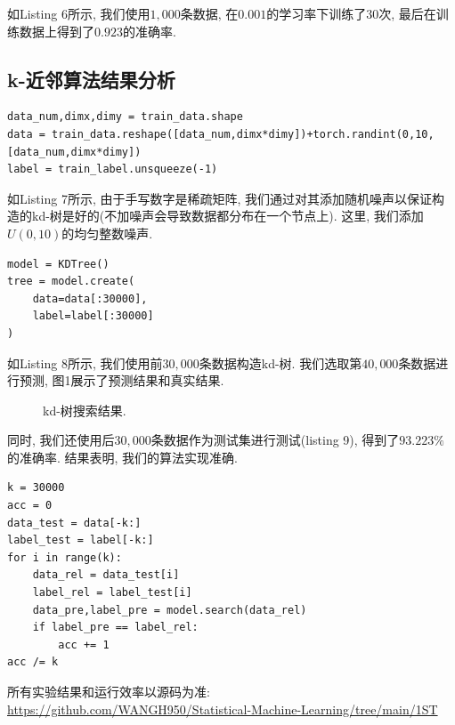 如Listing 6所示, 我们使用$1,000$条数据, 在$0.001$的学习率下训练了$30$次, 最后在训练数据上得到了$0.923$的准确率.
\subsection{k-近邻算法结果分析}
\begin{lstlisting}[caption = MNIST数据预处理]
data_num,dimx,dimy = train_data.shape
data = train_data.reshape([data_num,dimx*dimy])+torch.randint(0,10,[data_num,dimx*dimy])
label = train_label.unsqueeze(-1)
\end{lstlisting}

如Listing 7所示, 由于手写数字是稀疏矩阵, 我们通过对其添加随机噪声以保证构造的kd-树是好的(不加噪声会导致数据都分布在一个节点上). 
这里, 我们添加$U(0,10)$的均匀整数噪声.
\begin{lstlisting}[caption = 构造kd-树]
model = KDTree()
tree = model.create(
    data=data[:30000],
    label=label[:30000]
)
\end{lstlisting}

如Listing 8所示, 我们使用前$30,000$条数据构造kd-树. 我们选取第$40,000$条数据进行预测, 图1展示了预测结果和真实结果.
\begin{figure}[htpb]
    \centering
    \caption{kd-树搜索结果.}
    \label{figure1}
\end{figure}

同时, 我们还使用后$30,000$条数据作为测试集进行测试(listing 9), 得到了$93.223\%$的准确率. 结果表明, 我们的算法实现准确.
\begin{lstlisting}[caption = 使用kd-树分类测试数据]
k = 30000
acc = 0
data_test = data[-k:]
label_test = label[-k:]
for i in range(k):
    data_rel = data_test[i]
    label_rel = label_test[i]
    data_pre,label_pre = model.search(data_rel)
    if label_pre == label_rel:
        acc += 1
acc /= k
\end{lstlisting}

所有实验结果和运行效率以源码为准: \\
\url{https://github.com/WANGH950/Statistical-Machine-Learning/tree/main/1ST }
